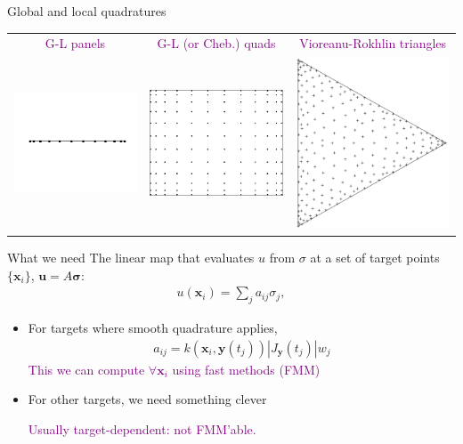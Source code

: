 \documentclass[t]{beamer}
\newcommand{\mbf}[1]{{\bm #1}}           %
\newcommand{\com}[1]{{\scriptsize \textcolor{purple}{#1}}}      %
\newcommand{\xx}{\mbf{x}}
\newcommand{\yy}{\mbf{y}}
\newcommand{\uu}{\mbf{u}}
\begin{document}
\begin{noframe}[c]{Global and local quadratures}
\begin{center}
\begin{tabular}{ccc}
      \\
      \com{G-L panels} & \com{G-L (or Cheb.) quads} & \com{Vioreanu-Rokhlin triangles}
      \\
      \includegraphics[height=0.15\textwidth]{fig/legpts}
      &
        \includegraphics[height=0.13\textwidth]{fig/tensorlegpts}
      &
        \includegraphics[height=0.15\textwidth]{fig/vr-triangle}
    \end{tabular}
  \end{center}
\end{noframe}

\begin{frame}{What we need}
  The linear map that evaluates $u$ from $\sigma$ at a set of target points $\{\xx_i\}$,
   $\uu=A\bm{\sigma}$:
    \begin{align}
      u(\xx_i) = \sum_j a_{ij} \sigma_j,
    \end{align}
    \begin{itemize}
    \item For targets where smooth quadrature applies,
    \begin{align}
      a_{ij} = k\left(\xx_i, \yy(t_j)\right) |J_\yy(t_j)| w_j
    \end{align}
    \com{This we can compute $\forall \xx_i$ using fast methods (FMM)}
  \item For other targets, we need something clever

    \com{Usually target-dependent: not FMM'able.}
  \end{itemize}
\end{frame}
\end{document}
